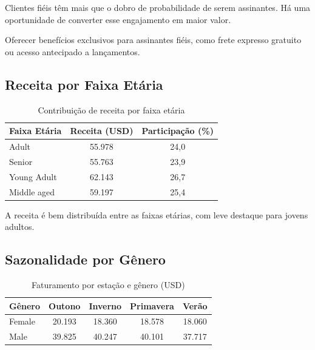 \documentclass[12pt,a4paper]{article}
\begin{document}
\begin{insightbox}
Clientes fiéis têm mais que o dobro de probabilidade de serem assinantes. Há uma oportunidade de converter esse engajamento em maior valor.
\end{insightbox}
\begin{actionbox}
Oferecer benefícios exclusivos para assinantes fiéis, como frete expresso gratuito ou acesso antecipado a lançamentos.
\end{actionbox}

\subsection{Receita por Faixa Etária}
\begin{table}[H]
\centering
\caption{Contribuição de receita por faixa etária}
\label{tab:receita_idade}
\begin{tabular}{lcc}
\toprule
\rowcolor{lightgray} \textbf{Faixa Etária} & \textbf{Receita (USD)} & \textbf{Participação (\%)} \\
\midrule
Adult       & 55.978 & 24,0 \\
Senior      & 55.763 & 23,9 \\
Young Adult & 62.143 & 26,7 \\
Middle aged & 59.197 & 25,4 \\
\bottomrule
\end{tabular}
\end{table}

\begin{insightbox}
A receita é bem distribuída entre as faixas etárias, com leve destaque para jovens adultos.
\end{insightbox}

\subsection{Sazonalidade por Gênero}
\begin{table}[H]
\centering
\caption{Faturamento por estação e gênero (USD)}
\label{tab:sazonalidade}
\begin{tabular}{lcccc}
\toprule
\rowcolor{lightgray} \textbf{Gênero} & \textbf{Outono} & \textbf{Inverno} & \textbf{Primavera} & \textbf{Verão} \\
\midrule
Female & 20.193 & 18.360 & 18.578 & 18.060 \\
Male   & 39.825 & 40.247 & 40.101 & 37.717 \\
\bottomrule
\end{tabular}
\end{table}
\end{document}

